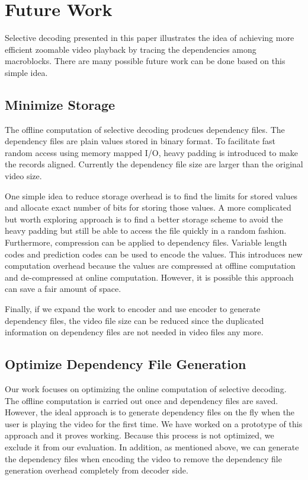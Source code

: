 \section{Future Work}
Selective decoding presented in this paper illustrates the idea of achieving more efficient zoomable video playback by tracing the dependencies among macroblocks. There are many possible future work can be done based on this simple idea. 
\subsection{Minimize Storage} 
The offline computation of selective decoding prodcues dependency files. The dependency files are plain values stored in binary format. To facilitate fast random access using memory mapped I/O, heavy padding is introduced to make the records aligned. Currently the dependency file size are larger than the original video size. 

One simple idea to reduce storage overhead is to find the limits for stored values and allocate exact number of bits for storing those values. A more complicated but worth exploring approach is to find a better storage scheme to avoid the heavy padding but still be able to access the file quickly in a random fashion. Furthermore, compression can be applied to dependency files. Variable length codes and prediction codes can be used to encode the values. This introduces new computation overhead because the values are compressed at offline computation and de-compressed at online computation. However, it is possible this approach can save a fair amount of space. 

Finally, if we expand the work to encoder and use encoder to generate dependency files, the video file size can be reduced since the duplicated information on dependency files are not needed in video files any more. 

\subsection{Optimize Dependency File Generation}
Our work focuses on optimizing the online computation of selective decoding. The offline computation is carried out once and dependency files are saved. However, the ideal approach is to generate dependency files on the fly when the user is playing the video for the first time. We have worked on a prototype of this approach and it proves working. Because this process is not optimized, we exclude it from our evaluation. In addition, as mentioned above, we can generate the dependency files when encoding the video to remove the dependency file generation overhead completely from decoder side. 

